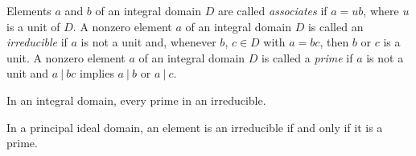 
\begin{definition}
	Elements $a$ and $b$ of an integral domain $D$ are called \textit{associates} if $a = ub$, where $u$ is a unit of $D$. A nonzero element $a$ of an integral domain $D$ is called an \textit{irreducible} if $a$ is not a unit and, whenever $b$, $c \in D$ with $a = bc$, then $b$ or $c$ is a unit. A nonzero element $a$ of an integral domain $D$ is called a \textit{prime} if $a$ is not a unit and $a\ \vert\ bc$ implies $a\ \vert\ b$ or $a\ \vert\ c$.
\end{definition}

\begin{theorem}
	In an integral domain, every prime in an irreducible.
\end{theorem}

\begin{theorem}
	In a principal ideal domain, an element is an irreducible if and only if it is a prime.
\end{theorem}
